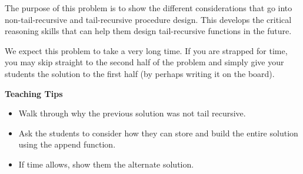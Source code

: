 \begin{blocksection}
\begin{guide}
The purpose of this problem is to show the different considerations that go into non-tail-recursive
and tail-recursive procedure design. This develops the critical reasoning skills that can help
them design tail-recursive functions in the future. 

We expect this problem to take a very long time. If you are strapped for time, you may skip straight to the second
half of the problem and simply give your students the solution to the first half (by perhaps writing it on the board). 

\textbf{Teaching Tips}
\begin{itemize}
	\item Walk through why the previous solution was not tail recursive.
	\item Ask the students to consider how they can store and build the entire solution using the append function.
	\item If time allows, show them the alternate solution.
\end{itemize}
\end{guide}
\end{blocksection}